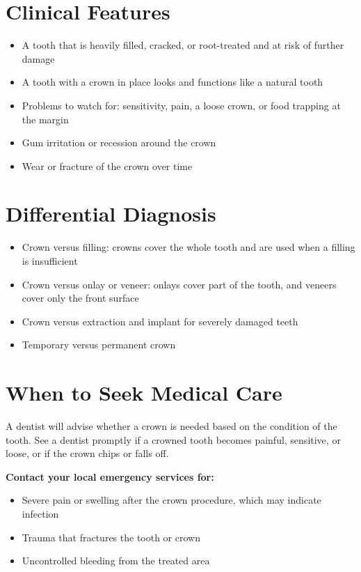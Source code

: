 \section*{Clinical Features}
\begin{itemize}
    \item A tooth that is heavily filled, cracked, or root-treated and at risk of further damage
    \item A tooth with a crown in place looks and functions like a natural tooth
    \item Problems to watch for: sensitivity, pain, a loose crown, or food trapping at the margin
    \item Gum irritation or recession around the crown
    \item Wear or fracture of the crown over time
\end{itemize}

\section*{Differential Diagnosis}
\begin{itemize}
    \item Crown versus filling: crowns cover the whole tooth and are used when a filling is insufficient
    \item Crown versus onlay or veneer: onlays cover part of the tooth, and veneers cover only the front surface
    \item Crown versus extraction and implant for severely damaged teeth
    \item Temporary versus permanent crown
\end{itemize}

\section*{When to Seek Medical Care}
A dentist will advise whether a crown is needed based on the condition of the tooth. See a dentist promptly if a crowned tooth becomes painful, sensitive, or loose, or if the crown chips or falls off.

\textbf{Contact your local emergency services for:}
\begin{itemize}
    \item Severe pain or swelling after the crown procedure, which may indicate infection
    \item Trauma that fractures the tooth or crown
    \item Uncontrolled bleeding from the treated area
\end{itemize}

